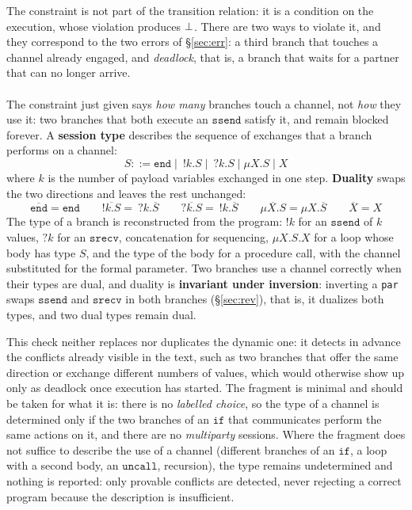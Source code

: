 \medskip
\noindent
The constraint is not part of the transition relation: it is a condition
on the execution, whose violation produces $\bot$. There are two ways to violate it, and
they correspond to the two errors of \S\ref{sec:err}: a third branch that touches a channel
already engaged, and \emph{deadlock}, that is, a branch that waits for a partner that can
no longer arrive.

\paragraph{} The constraint just given says \emph{how many}
branches touch a channel, not \emph{how} they use it: two branches that both execute
an $\mathtt{ssend}$ satisfy it, and remain blocked forever. A
\textbf{session type} describes the sequence of exchanges that a branch performs
on a channel:
\[
S ::= \mathtt{end} \mid\ !k.S \mid\ ?k.S \mid \mu X.S \mid X
\]
where $k$ is the number of payload variables exchanged in one step. \textbf{Duality}
swaps the two directions and leaves the rest unchanged:
\[
\overline{\mathtt{end}} = \mathtt{end} \qquad
\overline{!k.S} =\ ?k.\overline{S} \qquad
\overline{?k.S} =\ !k.\overline{S} \qquad
\overline{\mu X.S} = \mu X.\overline{S} \qquad
\overline{X} = X
\]
The type of a branch is reconstructed from the program: $!k$ for an $\mathtt{ssend}$ of
$k$ values, $?k$ for an $\mathtt{srecv}$, concatenation for sequencing,
$\mu X.S.X$ for a loop whose body has type $S$, and the type of the body for a
procedure call, with the channel substituted for the formal parameter. Two branches
use a channel correctly when their types are dual, and duality is
\textbf{invariant under inversion}: inverting a \texttt{par} swaps
$\mathtt{ssend}$ and $\mathtt{srecv}$ in both branches (\S\ref{sec:rev}), that is, it
dualizes both types, and two dual types remain dual.

\medskip
\noindent
This check neither replaces nor duplicates the dynamic one: it detects in
advance the conflicts already visible in the text, such as two branches that offer the same
direction or exchange different numbers of values, which would otherwise
show up only as deadlock once execution has started. The fragment is minimal and should be taken for what
it is: there is no \emph{labelled choice}, so the type of a channel is
determined only if the two branches of an $\mathtt{if}$ that communicates perform the
same actions on it, and there are no \emph{multiparty} sessions. Where the
fragment does not suffice to describe the use of a channel (different branches of an $\mathtt{if}$,
a loop with a second body, an $\mathtt{uncall}$, recursion), the
type remains undetermined and nothing is reported: only provable
conflicts are detected, never rejecting a correct program because the
description is insufficient.


